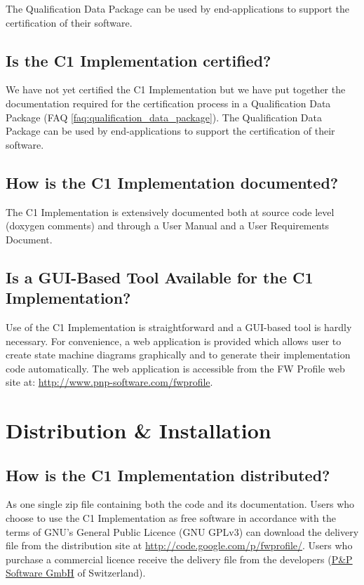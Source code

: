 \documentclass[a4paper,10pt]{article}
\let\stdsection\section
\renewcommand\section{\newpage\stdsection}
\begin{document}
The Qualification Data Package can be used by end-applications to support 
the certification of their software.

\subsection{Is the C1 Implementation certified?}
We have not yet certified the C1 Implementation but we have put together the documentation required for the certification process in a Qualification 
Data Package (FAQ \ref{faq:qualification_data_package}). The Qualification Data Package  can be used by end-applications to support the certification of their software.

\subsection{How is the C1 Implementation documented?}
The C1 Implementation is extensively documented both at source code level (doxygen comments) and through a User Manual and a User Requirements Document.

\subsection{Is a GUI-Based Tool Available for the C1 Implementation?}
Use of the C1 Implementation is straightforward and a GUI-based tool is hardly necessary. For convenience, a web application is provided which allows user to create state machine diagrams graphically and to generate their implementation code automatically. The web application is accessible from the FW Profile web site at: \url{http://www.pnp-software.com/fwprofile}.


\section{Distribution \& Installation}

\subsection{How is the C1 Implementation distributed?}
As one single zip file containing both the code and its documentation. Users who choose to use the C1 Implementation as free software in accordance with the terms of GNU's General Public Licence (GNU GPLv3) can download the delivery file from the distribution site at \url{http://code.google.com/p/fwprofile/}. Users who purchase a commercial licence receive the delivery file from the developers (\href{http://www.pnp-software.com/}{P\&P Software GmbH} of Switzerland).
\end{document}
